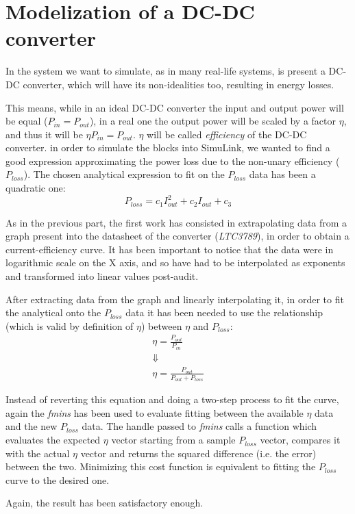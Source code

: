 \section{Modelization of a DC-DC converter}
In the system we want to simulate, as in many real-life systems, is present a DC-DC converter, which will have its non-idealities too, resulting in energy losses.

This means, while in an ideal DC-DC converter the input and output power will be equal ($P_{in}=P_{out}$), in a real one the output power will be scaled by a factor $\eta$, and thus it will be $\eta P_{in}=P_{out}$. $\eta$ will be called \emph{efficiency} of the DC-DC converter. in order to simulate the blocks into SimuLink, we wanted to find a good expression approximating the power loss due to the non-unary efficiency ($P_{loss}$). The chosen analytical expression to fit on the $P_{loss}$ data has been a quadratic one:
$$
P_{loss}=c_1I_{out}^2+c_2I_{out}+c_3
$$

As in the previous part, the first work has consisted in extrapolating data from a graph present into the datasheet of the converter (\emph{LTC3789}), in order to obtain a current-efficiency curve. It has been important to notice that the data were in logarithmic scale on the X axis, and so have had to be interpolated as exponents and transformed into linear values post-audit.

After extracting data from the graph and linearly interpolating it, in order to fit the analytical onto the $P_{loss}$ data it has been needed to use the relationship (which is valid by definition of $\eta$) between $\eta$ and $P_{loss}$:
\begin{gather*}
\eta=\frac{P_{out}}{P_{in}} \\
\Downarrow \\
\eta=\frac{P_{out}}{P_{out}+P_{loss}}
\end{gather*}

Instead of reverting this equation and doing a two-step process to fit the curve, again the \emph{fmins} has been used to evaluate fitting between the available $\eta$ data and the new $P_{loss}$ data. The handle passed to \emph{fmins} calls a function which evaluates the expected $\eta$ vector starting from a sample $P_{loss}$ vector, compares it with the actual $\eta$ vector and returns the squared difference (i.e. the error) between the two. Minimizing this cost function is equivalent to fitting the $P_{loss}$ curve to the desired one.

Again, the result has been satisfactory enough.

